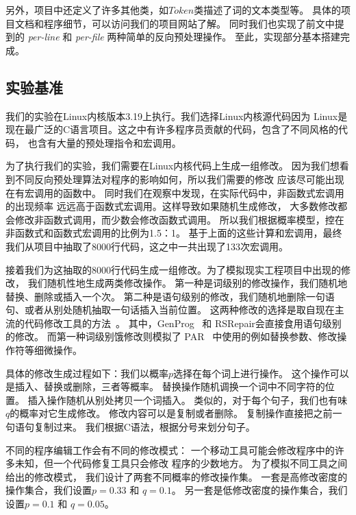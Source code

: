 另外，项目中还定义了许多其他类，如$Token$类描述了词的文本类型等。
具体的项目文档和程序细节，可以访问我们的项目网站了解。
同时我们也实现了前文中提到的 \emph{per-line} 和 \emph{per-file}
两种简单的反向预处理操作。
至此，实现部分基本搭建完成。


\subsection{实验基准}
我们的实验在Linux内核版本3.19上执行。我们选择Linux内核源代码因为
Linux是现在最广泛的C语言项目。这之中有许多程序员贡献的代码，包含了不同风格的代码，
也含有大量的预处理指令和宏调用。

为了执行我们的实验，我们需要在Linux内核代码上生成一组修改。
因为我们想看到不同反向预处理算法对程序的影响如何，所以我们需要的修改
应该尽可能出现在有宏调用的函数中。
同时我们在观察中发现，在实际代码中，非函数式宏调用的出现频率
远远高于函数式宏调用。这样导致如果随机生成修改，
大多数修改都会修改非函数式调用，而少数会修改函数式调用。
所以我们根据概率模型，控在非函数式和函数式宏调用的比例为1.5：1。
基于上面的这些计算和宏调用，最终我们从项目中抽取了8000行代码，这之中一共出现了133次宏调用。

接着我们为这抽取的8000行代码生成一组修改。为了模拟现实工程项目中出现的修改，
我们随机性地生成两类修改操作。
第一种是词级别的修改操作，我们随机地替换、删除或插入一个次。
第二种是语句级别的修改，我们随机地删除一句语句、或者从别处随机抽取一句话插入当前位置。
这两种修改的选择是取自现在主流的代码修改工具的方法~\parencite{le2012genprog,QiMLDW14,kim2013automatic}。
其中，GenProg~\parencite{le2012genprog} 和
RSRepair\parencite{QiMLDW14}会直接食用语句级别的修改。
而第一种词级别饿修改则模拟了 PAR~\parencite{kim2013automatic}
中使用的例如替换参数、修改操作符等细微操作。

具体的修改生成过程如下：我们以概率$p$选择在每个词上进行操作。
这个操作可以是插入、替换或删除，三者等概率。
替换操作随机调换一个词中不同字符的位置。
插入操作随机从别处拷贝一个词插入。
类似的，对于每个句子，我们也有味$q$的概率对它生成修改。
修改内容可以是复制或者删除。
复制操作直接把之前一句语句复制过来。
我们根据C语法，根据分号来划分句子。

不同的程序编辑工作会有不同的修改模式：
一个移动工具可能会修改程序中的许多未知，但一个代码修复工具只会修改
程序的少数地方。
为了模拟不同工具之间给出的修改模式，
我们设计了两套不同概率的修改操作集。
一套是高修改密度的操作集合，我们设置$p=0.33$ 和 $q=0.1$。
另一套是低修改密度的操作集合，我们设置$p=0.1$ 和 $q=0.05$。

